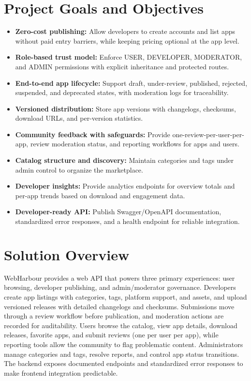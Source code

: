 \documentclass[12pt,a4paper]{article}
\begin{document}
\section{Project Goals and Objectives}
\begin{itemize}
    \item \textbf{Zero-cost publishing:} Allow developers to create accounts and list apps without paid entry barriers, while keeping pricing optional at the app level.
    \item \textbf{Role-based trust model:} Enforce USER, DEVELOPER, MODERATOR, and ADMIN permissions with explicit inheritance and protected routes.
    \item \textbf{End-to-end app lifecycle:} Support draft, under-review, published, rejected, suspended, and deprecated states, with moderation logs for traceability.
    \item \textbf{Versioned distribution:} Store app versions with changelogs, checksums, download URLs, and per-version statistics.
    \item \textbf{Community feedback with safeguards:} Provide one-review-per-user-per-app, review moderation status, and reporting workflows for apps and users.
    \item \textbf{Catalog structure and discovery:} Maintain categories and tags under admin control to organize the marketplace.
    \item \textbf{Developer insights:} Provide analytics endpoints for overview totals and per-app trends based on download and engagement data.
    \item \textbf{Developer-ready API:} Publish Swagger/OpenAPI documentation, standardized error responses, and a health endpoint for reliable integration.
\end{itemize}

\section{Solution Overview}
WebHarbour provides a web API that powers three primary experiences: user browsing, developer publishing, and admin/moderator governance. Developers create app listings with categories, tags, platform support, and assets, and upload versioned releases with detailed changelogs and checksums. Submissions move through a review workflow before publication, and moderation actions are recorded for auditability. Users browse the catalog, view app details, download releases, favorite apps, and submit reviews (one per user per app), while reporting tools allow the community to flag problematic content. Administrators manage categories and tags, resolve reports, and control app status transitions. The backend exposes documented endpoints and standardized error responses to make frontend integration predictable.
\end{document}
